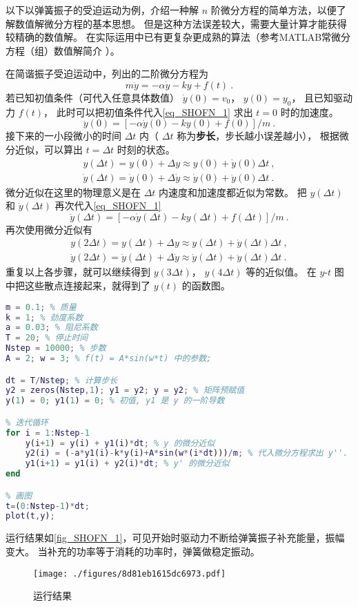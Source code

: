 

以下以弹簧振子的受迫运动为例，介绍一种解 $n$ 阶微分方程的简单方法，以便了解数值解微分方程的基本思想。 但是这种方法误差较大，需要大量计算才能获得较精确的数值解。 在实际运用中已有更复杂更成熟的算法（参考MATLAB常微分方程（组）数值解简介%
）。

在简谐振子受迫运动中，列出的二阶微分方程为
\begin{equation}\label{eq_SHOFN_1}
m\ddot y = -\alpha \dot y - ky + f(t)~.
\end{equation}
若已知初值条件（可代入任意具体数值） $\dot y(0) = v_0$，  $y(0) = y_0$， 且已知驱动力 $f(t)$， 此时可以把初值条件代入\autoref{eq_SHOFN_1} 求出 $t = 0$ 时的加速度。
\begin{equation}
\ddot y(0) = [- \alpha \dot y(0) - ky(0) + f(0)]/m~.
\end{equation}
接下来的一小段微小的时间 $\Delta t$ 内（ $\Delta t$ 称为\textbf{步长}，步长越小误差越小）， 根据微分近似，可以算出 $t = \Delta t$ 时刻的状态。
\begin{gather}
y(\Delta t) =  y(0) + \Delta y \approx y(0) + \dot y(0) \Delta t~,\\
\dot y(\Delta t) = \dot y(0) + \Delta \dot y \approx \dot y(0) + \ddot y(0) \Delta t~.
\end{gather}
微分近似在这里的物理意义是在 $\Delta t$ 内速度和加速度都近似为常数。 把 $y(\Delta t)$ 和 $\dot y(\Delta t)$ 再次代入\autoref{eq_SHOFN_1}
\begin{equation}
\ddot y(\Delta t) = [- \alpha \dot y(\Delta t) - ky(\Delta t) + f(\Delta t)]/m~.
\end{equation}
再次使用微分近似有
\begin{gather}
y(2\Delta t) =  y(\Delta t) + \Delta y \approx y(\Delta t) + \dot y(\Delta t) \Delta t~,\\
\dot y(2\Delta t) = \dot y(\Delta t) + \Delta \dot y \approx \dot y(\Delta t) + \ddot y(\Delta t) \Delta t~.
\end{gather}
重复以上各步骤，就可以继续得到 $y(3\Delta t)$，  $y(4\Delta t)$ 等的近似值。 在 $y$-$t$ 图中把这些散点连接起来，就得到了 $y(t)$ 的函数图。

\begin{lstlisting}[language=matlab, caption=SHOf.m]
% 参数设定
m = 0.1; % 质量
k = 1; % 劲度系数
a = 0.03; % 阻尼系数
T = 20; % 停止时间
Nstep = 10000; % 步数
A = 2; w = 3; % f(t) = A*sin(w*t) 中的参数;

dt = T/Nstep; % 计算步长
y2 = zeros(Nstep,1); y1 = y2; y = y2; % 矩阵预赋值
y(1) = 0; y1(1) = 0; % 初值, y1 是 y 的一阶导数

% 迭代循环
for i = 1:Nstep-1
    y(i+1) = y(i) + y1(i)*dt; % y 的微分近似
    y2(i) = (-a*y1(i)-k*y(i)+A*sin(w*(i*dt)))/m; % 代入微分方程求出 y''.
    y1(i+1) = y1(i) + y2(i)*dt; % y' 的微分近似
end

% 画图
t=(0:Nstep-1)*dt;
plot(t,y);
\end{lstlisting}

运行结果如\autoref{fig_SHOFN_1}，可见开始时驱动力不断给弹簧振子补充能量，振幅变大。 当补充的功率等于消耗的功率时，弹簧做稳定振动。
\begin{figure}[ht]
\centering
\texttt{[image: ./figures/8d81eb1615dc6973.pdf]}
\caption{运行结果}\label{fig_SHOFN_1}
\end{figure}
